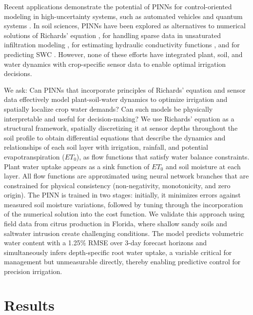 \documentclass[pdflatex,sn-nature]{sn-jnl}%
\theoremstyle{thmstyleone}%
\theoremstyle{thmstyletwo}%
\theoremstyle{thmstylethree}%
\begin{document}
Recent applications demonstrate the potential of PINNs for control-oriented modeling in high-uncertainty systems, such as automated vehicles and quantum systems \cite{Li2024, Zhang2025}. In soil sciences, PINNs have been explored as alternatives to numerical solutions of Richards' equation \cite{Bandai2022}, for handling sparse data in unsaturated infiltration modeling \cite{Lan2024}, for estimating hydraulic conductivity functions \cite{Elkha2024}, and for predicting SWC \cite{Bagheri2025}.  However, none of these efforts have integrated plant, soil, and water dynamics with crop-specific sensor data to enable optimal irrigation decisions.

We ask: Can PINNs that incorporate principles of Richards' equation and sensor data effectively model plant-soil-water dynamics to optimize irrigation and spatially localize crop water demands? Can such models be physically interpretable and useful for decision-making? We use Richards' equation as a structural framework, spatially discretizing it at sensor depths throughout the soil profile to obtain differential equations that describe the dynamics and relationships of each soil layer with irrigation, rainfall, and potential evapotranspiration ($ET_0$), as flow functions that satisfy water balance constraints. Plant water uptake appears as a sink function of $ET_0$ and soil moisture at each layer. All flow functions are approximated using neural network branches that are constrained for physical consistency (non-negativity, monotonicity, and zero origin). The PINN is trained in two stages: initially, it minimizes errors against measured soil moisture variations, followed by tuning through the incorporation of the numerical solution into the cost function. We validate this approach using field data from citrus production in Florida, where shallow sandy soils and saltwater intrusion create challenging conditions. The model predicts volumetric water content with a 1.25\% RMSE over 3-day forecast horizons and simultaneously infers depth-specific root water uptake, a variable critical for management but unmeasurable directly, thereby enabling predictive control for precision irrigation.


\section{Results}
\end{document}
